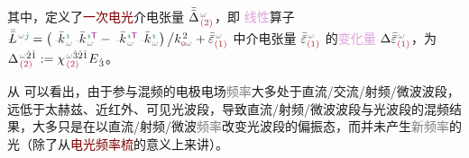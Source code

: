 其中，定义了\textcolor{Maroon}{一次电光}\textcolor{PineGreen}{介电张量} $\bar{\bar{\Delta}}^{\;\! \mathcolor{gray}{\omega} }_{\;\! \textcolor{Maroon}{(2)}}$，即 \textcolor{Plum}{线性}算子 $\xint{\mathcolor{gray}{-}}{30}{\bar{\bar{L}}}^{\;\! \mathcolor{gray}{\omega} \textcolor{PineGreen}{\hat{\jmath}}} = \left( \xint{\begin{smallmatrix} ~ \\ {}^{}_{\mathcolor{gray}{-}} \\ ~ \end{smallmatrix}}{15}{\bar{k}}_{\;\! \mathcolor{gray}{\omega}}^{\;\! \textcolor{PineGreen}{\imath}} \xint{\begin{smallmatrix} ~ \\ {}^{}_{\mathcolor{gray}{-}} \\ ~ \end{smallmatrix}}{15}{\bar{k}}_{\;\! \mathcolor{gray}{\omega}}^{\;\! \textcolor{PineGreen}{\imath} {\mathsf{\textcolor{Plum}{T}}}} - \xint{\begin{smallmatrix} ~ \\ {}^{}_{\mathcolor{gray}{-}} \\ ~ \end{smallmatrix}}{15}{\bar{k}}_{\;\! \mathcolor{gray}{\omega}}^{\;\! \textcolor{PineGreen}{\imath} {\mathsf{\textcolor{Plum}{T}}}} \xint{\begin{smallmatrix} ~ \\ {}^{}_{\mathcolor{gray}{-}} \\ ~ \end{smallmatrix}}{15}{\bar{k}}_{\;\! \mathcolor{gray}{\omega}}^{\;\! \textcolor{PineGreen}{\imath}} \right) \big/ k_{\textcolor{Maroon}{\mathsf{o}} \mathcolor{gray}{\omega}}^{\;\! 2} + \bar{\bar{\varepsilon}}^{\;\! \mathcolor{gray}{\omega}}_{\textcolor{Maroon}{(1)}}$ 中\textcolor{PineGreen}{介电张量} $\bar{\bar{\varepsilon}}^{\;\! \mathcolor{gray}{\omega}}_{\textcolor{Maroon}{(1)}}$ 的\textcolor{Plum}{变化量} $\Delta \bar{\bar{\varepsilon}}^{\;\! \mathcolor{gray}{\omega}}_{\textcolor{Maroon}{(1)}}$，为 ${\Delta}^{\;\! \mathcolor{gray}{\omega} \hat{2} \hat{1} }_{\;\! \textcolor{Maroon}{(2)} } := {\chi}^{\;\! \mathcolor{gray}{\omega} \hat{3} \hat{2} \hat{1} }_{\;\! \textcolor{Maroon}{(2)} } {E}_{\;\! \hat{3} }$。

从  可以看出，由于参与混频的电极电场\textcolor{gray}{频率}大多处于\textcolor{NavyBlue}{直流}/\textcolor{NavyBlue}{交流}/\textcolor{NavyBlue}{射频}/\textcolor{NavyBlue}{微波}波段，远低于\textcolor{NavyBlue}{太赫兹}、\textcolor{NavyBlue}{近红外}、\textcolor{NavyBlue}{可见光}波段，导致\textcolor{NavyBlue}{直流}/\textcolor{NavyBlue}{射频}/\textcolor{NavyBlue}{微波}波段与\textcolor{NavyBlue}{光波段}的混频结果，大多只是在以\textcolor{NavyBlue}{直流}/\textcolor{NavyBlue}{射频}/\textcolor{NavyBlue}{微波}\textcolor{gray}{频率}改变\textcolor{NavyBlue}{光波段}的偏振态，而并未产生\textcolor{gray}{新频率}的\textcolor{NavyBlue}{光}（除了从\textcolor{Maroon}{电光频率梳}的意义上来讲）。

